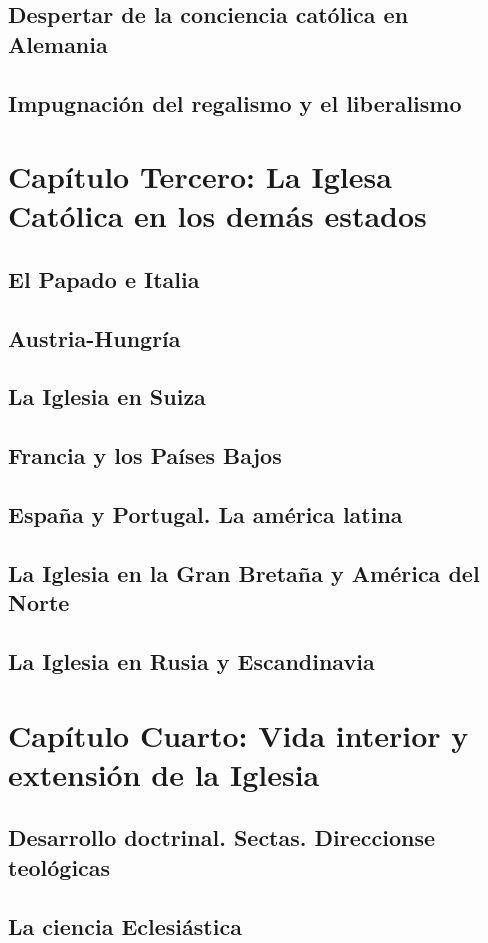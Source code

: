 \raggedbottom{} \documentclass[12pt, a4paper]{book}
\begin{document}
\section{Despertar de la conciencia católica en Alemania}
\section{Impugnación del regalismo y el liberalismo}
\chapter{Capítulo Tercero: La Iglesa Católica en los demás estados}
\section{El Papado e Italia}
\section{Austria-Hungría}
\section{La Iglesia en Suiza}
\section{Francia y los Países Bajos}
\section{España y Portugal. La américa latina}
\section{La Iglesia en la Gran Bretaña y América del Norte}
\section{La Iglesia en Rusia y Escandinavia}
\chapter{Capítulo Cuarto: Vida interior y extensión de la Iglesia}
\section{Desarrollo doctrinal. Sectas. Direccionse teológicas}
\section{La ciencia Eclesiástica}
\end{document}

